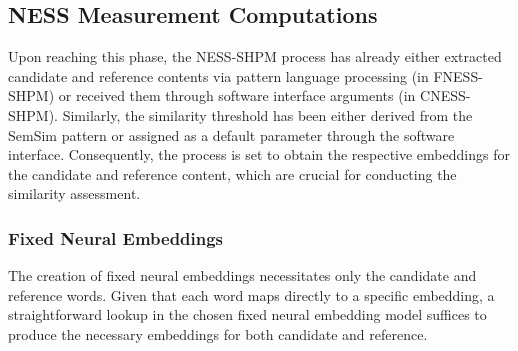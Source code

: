 \documentclass[11pt]{scrreprt}
\begin{document}
%
%
%
%




\subsection{NESS Measurement Computations}
Upon reaching this phase, the NESS-SHPM process has already either extracted candidate and reference contents via pattern language processing (in FNESS-SHPM) or received them through software interface arguments (in CNESS-SHPM). Similarly, the similarity threshold has been either derived from the SemSim pattern or assigned as a default parameter through the software interface. Consequently, the process is set to obtain the respective embeddings for the candidate and reference content, which are crucial for conducting the similarity assessment.



\subsubsection{Fixed Neural Embeddings}
The creation of fixed neural embeddings necessitates only the candidate and reference words. Given that each word maps directly to a specific embedding, a straightforward lookup in the chosen fixed neural embedding model suffices to produce the necessary embeddings for both candidate and reference.
\end{document}

